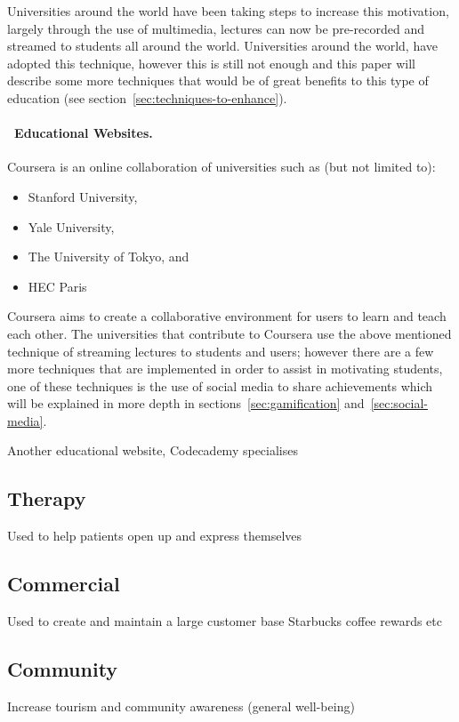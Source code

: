 \documentclass[a4paper,12pt]{article}
\begin{document}
\par
Universities around the world have been taking steps to increase this motivation, largely through the use of multimedia, lectures can now be pre-recorded and streamed to students all around the world. Universities around the world, have adopted this technique, however this is still not enough and this paper will describe some more techniques that would be of great benefits to this type of education (see section~\ref{sec:techniques-to-enhance}).

\paragraph{\indent~Educational Websites.} 
Coursera is an online collaboration of universities such as (but not limited to): 
\begin{itemize}
	\item{Stanford University,}
	\item{Yale University,}
	\item{The University of Tokyo, and}
	\item{HEC Paris}
\end{itemize}
Coursera aims to create a collaborative environment for users to learn and teach each other. The universities that contribute to Coursera use the above mentioned technique of streaming lectures to students and users; however there are a few more techniques that are implemented in order to assist in motivating students, one of these techniques is the use of social media to share achievements which will be explained in more depth in sections~\ref{sec:gamification} and~\ref{sec:social-media}.

\par
Another educational website, Codecademy specialises

\subsection{Therapy}
Used to help patients open up and express themselves
\subsection{Commercial}
Used to create and maintain a large customer base
Starbucks coffee rewards etc
\subsection{Community}
Increase tourism and community awareness (general well-being)
\end{document}

